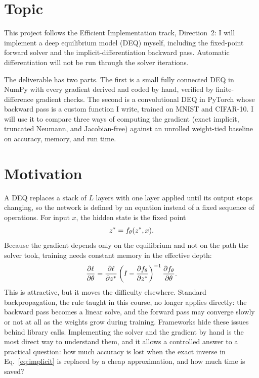 \documentclass[11pt]{article}
\begin{document}
\makeheader

\section{Topic}

This project follows the Efficient Implementation track, Direction~2: I will
implement a deep equilibrium model (DEQ) myself, including the fixed-point
forward solver and the implicit-differentiation backward pass. Automatic
differentiation will not be run through the solver iterations.

The deliverable has two parts. The first is a small fully connected DEQ in
NumPy with every gradient derived and coded by hand, verified by
finite-difference gradient checks. The second is a convolutional DEQ in
PyTorch whose backward pass is a custom function I write, trained on MNIST and
CIFAR-10. I will use it to compare three ways of computing the gradient (exact
implicit, truncated Neumann, and Jacobian-free) against an unrolled weight-tied
baseline on accuracy, memory, and run time.

\section{Motivation}

A DEQ replaces a stack of $L$ layers with one layer applied until its output
stops changing, so the network is defined by an equation instead of a fixed
sequence of operations. For input $x$, the hidden state is the fixed point
\begin{equation}
  z^{*} = f_{\theta}(z^{*}, x).
\end{equation}
Because the gradient depends only on the equilibrium and not on the path the
solver took, training needs constant memory in the effective depth:
\begin{equation}
  \frac{\partial \ell}{\partial \theta}
  = \frac{\partial \ell}{\partial z^{*}}\left(I - \frac{\partial f_{\theta}}{\partial z^{*}}\right)^{-1}\frac{\partial f_{\theta}}{\partial \theta}.
  \label{eq:implicit}
\end{equation}
This is attractive, but it moves the difficulty elsewhere. Standard
backpropagation, the rule taught in this course, no longer applies directly:
the backward pass becomes a linear solve, and the forward pass may converge
slowly or not at all as the weights grow during training. Frameworks hide these
issues behind library calls. Implementing the solver and the gradient by hand
is the most direct way to understand them, and it allows a controlled answer to
a practical question: how much accuracy is lost when the exact inverse in
Eq.~\eqref{eq:implicit} is replaced by a cheap approximation, and how much time
is saved?
\end{document}
